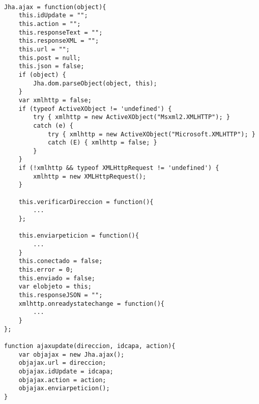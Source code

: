\begin{lstlisting}[label=js_ajax,caption=Objeto JSON Jha.ajax. ]

Jha.ajax = function(object){
    this.idUpdate = "";
    this.action = "";
    this.responseText = "";
    this.responseXML = "";
    this.url = "";
    this.post = null;
    this.json = false;
    if (object) {
        Jha.dom.parseObject(object, this);
    }    
    var xmlhttp = false;
    if (typeof ActiveXObject != 'undefined') {
        try { xmlhttp = new ActiveXObject("Msxml2.XMLHTTP"); } 
        catch (e) {
            try { xmlhttp = new ActiveXObject("Microsoft.XMLHTTP"); } 
            catch (E) { xmlhttp = false; }
        }
    }
    if (!xmlhttp && typeof XMLHttpRequest != 'undefined') {
        xmlhttp = new XMLHttpRequest();
    }
    
    this.verificarDireccion = function(){
        ...
    };
    
    this.enviarpeticion = function(){
        ...
    }
    this.conectado = false;
    this.error = 0;
    this.enviado = false;
    var elobjeto = this;
    this.responseJSON = "";
    xmlhttp.onreadystatechange = function(){
        ...
    }
};

function ajaxupdate(direccion, idcapa, action){
    var objajax = new Jha.ajax();
    objajax.url = direccion;
    objajax.idUpdate = idcapa;
    objajax.action = action;
    objajax.enviarpeticion();
}
\end{lstlisting}
